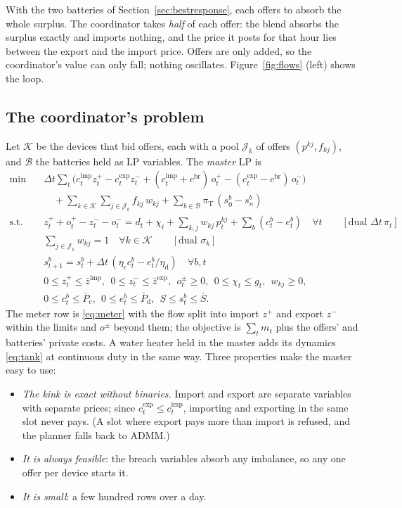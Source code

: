 \documentclass[11pt,a4paper]{article}
\newcommand{\Ec}{\eta_{\mathrm c}}
\newcommand{\Ed}{\eta_{\mathrm d}}
\newcommand{\dt}{\Delta t}
\newcommand{\cimp}{c^{\mathrm{imp}}}
\newcommand{\cexp}{c^{\mathrm{exp}}}
\newcommand{\cbr}{c^{\mathrm{br}}}
\newcommand{\zimp}{\bar z^{\mathrm{imp}}}
\newcommand{\zexp}{\bar z^{\mathrm{exp}}}
\begin{document}
With the two batteries of Section~\ref{sec:bestresponse}, each offers to absorb
the whole surplus. The coordinator takes \emph{half} of each offer: the blend
absorbs the surplus exactly and imports nothing, and the price it posts for that
hour lies between the export and the import price. Offers are only added, so the
coordinator's value can only fall; nothing oscillates. Figure~\ref{fig:flows}
(left) shows the loop.

\subsection{The coordinator's problem}
\label{sec:master}

Let $\mathcal K$ be the devices that bid offers, each with a pool
$\mathcal J_k$ of offers $(p^{kj}, f_{kj})$, and $\mathcal B$ the batteries
held as LP variables. The \emph{master} LP is
\begin{equation}
\begin{aligned}
\min\quad & \dt\sum_t \Big(\cimp_t z^+_t - \cexp_t z^-_t + (\cimp_t + \cbr)\,o^+_t - (\cexp_t - \cbr)\,o^-_t\Big) \\
  & \quad + \sum_{k \in \mathcal K}\sum_{j \in \mathcal J_k} f_{kj}\,w_{kj}
  + \sum_{b \in \mathcal B} \pi_{\mathrm T}\,(s^b_0 - s^b_n) \\
\text{s.t.}\quad
 & z^+_t + o^+_t - z^-_t - o^-_t = d_t + \chi_t + \textstyle\sum_{k,j} w_{kj}\,p^{kj}_t + \sum_b (c^b_t - e^b_t)
   \quad \forall t \qquad [\text{dual } \dt\,\pi_t] \\
 & \textstyle\sum_{j \in \mathcal J_k} w_{kj} = 1 \quad \forall k \in \mathcal K \qquad [\text{dual } \sigma_k] \\
 & s^b_{t+1} = s^b_t + \dt\,(\Ec c^b_t - e^b_t/\Ed) \quad \forall b, t \\
 & 0 \le z^+_t \le \zimp,\ \ 0 \le z^-_t \le \zexp,\ \ o^\pm_t \ge 0,\ \ 0 \le \chi_t \le g_t,\ \ w_{kj} \ge 0, \\
 & 0 \le c^b_t \le \bar P_{\mathrm c},\ \ 0 \le e^b_t \le \bar P_{\mathrm d},\ \ \underline S \le s^b_t \le \bar S .
\end{aligned}
\label{eq:master}
\end{equation}
The meter row is \eqref{eq:meter} with the flow split into import $z^+$ and
export $z^-$ within the limits and $o^\pm$ beyond them; the objective is
$\sum_t m_t$ plus the offers' and batteries' private costs. A water heater held
in the master adds its dynamics \eqref{eq:tank} at continuous duty in the same
way. Three properties make the master easy to use:
\begin{itemize}[leftmargin=*,itemsep=1pt]
\item \emph{The kink is exact without binaries.} Import and export are separate
  variables with separate prices; since $\cexp_t \le \cimp_t$, importing and
  exporting in the same slot never pays. (A slot where export pays more than
  import is refused, and the planner falls back to ADMM.)
\item \emph{It is always feasible}: the breach variables absorb any imbalance,
  so any one offer per device starts it.
\item \emph{It is small}: a few hundred rows over a day.
\end{itemize}
\end{document}
